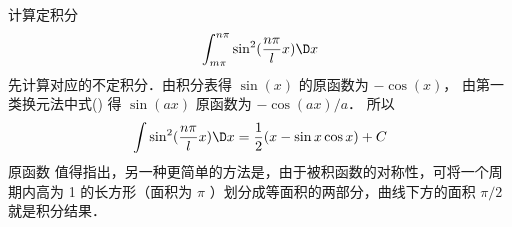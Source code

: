 \begin{exam}{计算定积分}
\begin{equation}
\int_{m\pi}^{n\pi} \sin^2(\frac{n\pi}{l} x) \D x
\end{equation}
先计算对应的不定积分．由积分表得 $\sin(x)$ 的原函数为 $-\cos(x)$， 由第一类换元法中式() %
得 $\sin(ax)$ 原函数为 $-\cos(ax)/a$． 所以
\begin{equation}
\int\sin^2(\frac{n\pi}{l} x) \D x = \frac{1}{2}(x - \sin x\cos x) + C
\end{equation}
原函数
值得指出，另一种更简单的方法是，由于被积函数的对称性，可将一个周期内高为 1 的长方形（面积为 $\pi$ ）划分成等面积的两部分，曲线下方的面积 $\pi /2$ 就是积分结果．%
\end{exam}
